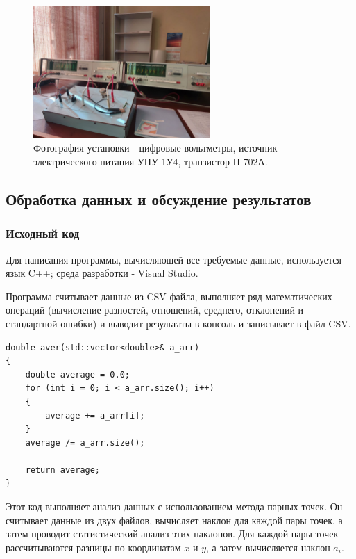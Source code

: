 \begin{figure}[H]
\centering
\includegraphics[width=0.6\textwidth]{Установка.jpg}
\caption{Фотография установки -  цифровые
вольтметры, источник электрического питания УПУ-1У4, транзистор П 702А.}
\label{fig:device}
\end{figure}


\subsection{Обработка данных и обсуждение результатов}

\subsubsection{Исходный код}
Для написания программы, вычисляющей все требуемые данные, используется язык C++; среда разработки - Visual Studio.

Программа считывает данные из CSV-файла, выполняет ряд математических операций (вычисление разностей, отношений, среднего, отклонений и стандартной ошибки) и выводит результаты в консоль и записывает в файл CSV. 

\begin{lstlisting}[label=listing1, caption=Функция вычисления среднего]
 double aver(std::vector<double>& a_arr)
{
	double average = 0.0;
	for (int i = 0; i < a_arr.size(); i++)
	{
		average += a_arr[i];
	}
	average /= a_arr.size();

	return average;
}

\end{lstlisting}

Этот код выполняет анализ данных с использованием метода парных точек. Он считывает данные из двух файлов, вычисляет наклон для каждой пары точек, а затем проводит статистический анализ этих наклонов. Для каждой пары точек рассчитываются разницы по координатам \( x \) и \( y \), а затем вычисляется наклон \( a_i\). 

